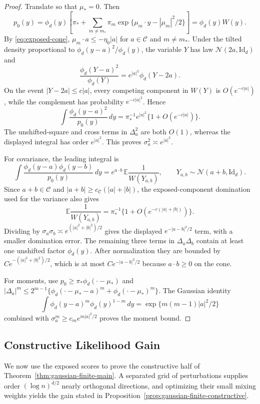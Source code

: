 \documentclass[11pt]{article}
\theoremstyle{definition}
\numberwithin{equation}{section}
\newcommand{\E}{\mathbb{E}}
\newcommand{\cN}{\mathcal{N}}
\newcommand{\Id}{\mathrm{Id}}
\begin{document}
\begin{proof}
Translate so that \(\mu_*=0\). Then
\[
    p_0(y)=\phi_d(y)
    \left[
        \pi_*+
        \sum_{m\ne m_*}\pi_m
        \exp\{\mu_m\cdot y-|\mu_m|^2/2\}
    \right]
    =\phi_d(y)W(y).
\]
By \eqref{eq:exposed-cone}, \(\mu_m\cdot a\le-\eta_0|a|\) for \(a\in\mathcal C\) and \(m\ne m_*\). Under the tilted density proportional to \(\phi_d(y-a)^2/\phi_d(y)\), the variable \(Y\) has law \(\cN(2a,\Id_d)\) and
\[
    \frac{\phi_d(Y-a)^2}{\phi_d(Y)}=e^{|a|^2}\phi_d(Y-2a).
\]
On the event \(|Y-2a|\le c|a|\), every competing component in \(W(Y)\) is \(O(e^{-c|a|})\), while the complement has probability \(e^{-c|a|^2}\). Hence
\[
    \int \frac{\phi_d(y-a)^2}{p_0(y)}\,dy
    =
    \pi_*^{-1}e^{|a|^2}\{1+O(e^{-c|a|})\}.
\]
The unshifted-square and cross terms in \(\Delta_a^2\) are both \(O(1)\),
whereas the displayed integral has order \(e^{|a|^2}\). This proves
\(\sigma_a^2\asymp e^{|a|^2}\).

For covariance, the leading integral is
\[
    \int\frac{\phi_d(y-a)\phi_d(y-b)}{p_0(y)}\,dy
    =
    e^{a\cdot b}\,\E\frac1{W(Y_{a,b})},
    \qquad
    Y_{a,b}\sim\cN(a+b,\Id_d).
\]
Since \(a+b\in\mathcal C\) and
\(|a+b|\ge c_{\mathcal C}(|a|+|b|)\), the exposed-component domination
used for the variance also gives
\[
    \E\frac1{W(Y_{a,b})}
    =
    \pi_*^{-1}\{1+O(e^{-c(|a|+|b|)})\}.
\]
Dividing by \(\sigma_a\sigma_b\asymp e^{(|a|^2+|b|^2)/2}\) gives the displayed \(e^{-|a-b|^2/2}\) term, with a smaller domination error. The remaining three terms in \(\Delta_a\Delta_b\) contain at least one unshifted factor \(\phi_d(y)\). After normalization they are bounded by \(C e^{-(|a|^2+|b|^2)/2}\), which is at most \(C e^{-|a-b|^2/2}\) because \(a\cdot b\ge0\) on the cone.

For moments, use \(p_0\ge\pi_*\phi_d(\cdot-\mu_*)\) and \(|\Delta_a|^m\le2^{m-1}\{\phi_d(\cdot-\mu_*-a)^m+\phi_d(\cdot-\mu_*)^m\}\). The Gaussian identity
\[
    \int \phi_d(y-a)^m\phi_d(y)^{1-m}\,dy
    =
    \exp\{m(m-1)|a|^2/2\}
\]
combined with \(\sigma_a^m\ge c_m e^{m|a|^2/2}\) proves the moment bound.
\end{proof}

\subsection{Constructive Likelihood Gain}
\label{sec:gaussian-constructive-gain}

We now use the exposed scores to prove the constructive half of
Theorem~\ref{thm:gaussian-finite-main}. A separated grid of perturbations
supplies order \((\log n)^{d/2}\) nearly orthogonal directions, and optimizing
their small mixing weights yields the gain stated in
Proposition~\ref{prop:gaussian-finite-constructive}.
\end{document}
